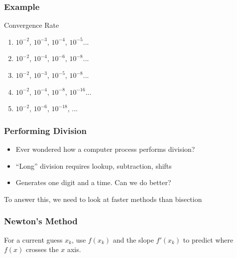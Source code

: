 \documentclass[10pt]{beamer}
\begin{document}
\begin{frame}
\frametitle{Example}
\begin{block}{Convergence Rate}
\begin{enumerate}
\item $10^{-2}$, $10^{-3}$, $10^{-4}$, $10^{-5}$... 
\item $10^{-2}$, $10^{-4}$, $10^{-6}$, $10^{-8}$... 
\item $10^{-2}$, $10^{-3}$, $10^{-5}$, $10^{-8}$... 
\item $10^{-2}$, $10^{-4}$, $10^{-8}$, $10^{-16}$...
\item $10^{-2}$, $10^{-6}$, $10^{-18}$, ... 
\end{enumerate}
\end{block}
\end{frame}
\begin{frame}
\frametitle{Performing Division}
\begin{itemize}
  \item Ever wondered how a computer process performs division?
  \item ``Long'' division requires lookup, subtraction, shifts
  \item Generates one digit and a time.  Can we do better?
\end{itemize}
To answer this, we need to look at faster methods than bisection
\end{frame}
\begin{frame}
\frametitle{Newton's Method}

\vspace{4ex}
\begin{center}
\end{center}

For a current guess $x_k$, use $f(x_k)$ and the slope $f'(x_k)$
to predict where $f(x)$ crosses the $x$ axis.




\end{frame}
\end{document}
